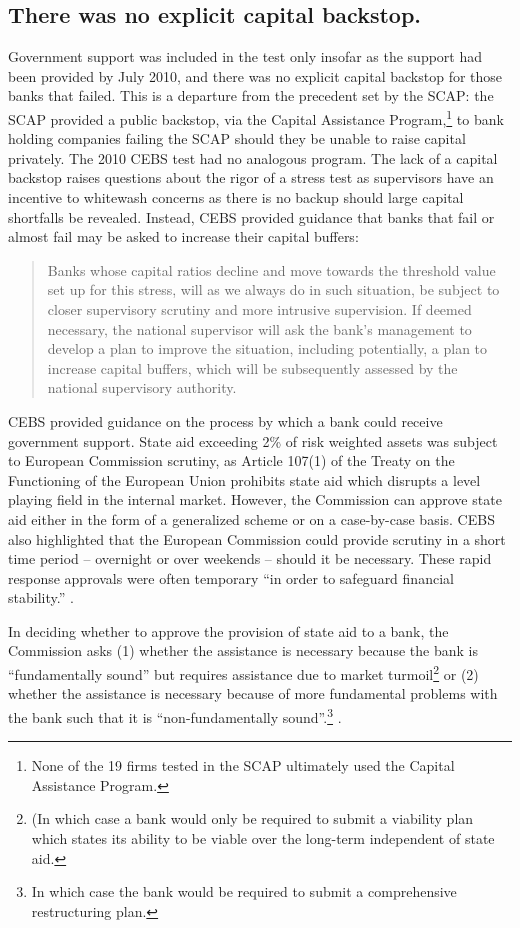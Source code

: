 \documentclass[12pt]{article}
\begin{document}
\subsection{There was no explicit capital backstop.}

Government support was included in the test only insofar as the support had been provided by July 2010, and there was no explicit capital backstop for those banks that failed. This is a departure from the precedent set by the SCAP: the SCAP provided a public backstop, via the Capital Assistance Program,\footnote{None of the 19 firms tested in the SCAP ultimately used the Capital Assistance Program.} to bank holding companies failing the SCAP should they be unable to raise capital privately. The 2010 CEBS test had no analogous program. The lack of a capital backstop raises questions about the rigor of a stress test as supervisors have an incentive to whitewash concerns as there is no backup should large capital shortfalls be revealed. Instead, CEBS provided guidance that banks that fail or almost fail may be asked to increase their capital buffers:

\begin{quote}
Banks whose capital ratios decline and move towards the threshold value set up for this stress, will as we always do in such situation, be subject to closer supervisory scrutiny and more intrusive supervision. If deemed necessary, the national supervisor will ask the bank's management to develop a plan to improve the situation, including potentially, a plan to increase capital buffers, which will be subsequently assessed by the national supervisory authority.
\end{quote}

CEBS provided guidance on the process by which a bank could receive government support. State aid exceeding 2\% of risk weighted assets was subject to European Commission scrutiny, as Article 107(1) of the Treaty on the Functioning of the European Union prohibits state aid which disrupts a level playing field in the internal market. However, the Commission can approve state aid either in the form of a generalized scheme or on a case-by-case basis. CEBS also highlighted that the European Commission could provide scrutiny in a short time period -- overnight or over weekends -- should it be necessary. These rapid response approvals were often temporary ``in order to safeguard financial stability.'' \citep{QA}.

In deciding whether to approve the provision of state aid to a bank, the Commission asks (1) whether the assistance is necessary because the bank is ``fundamentally sound'' but requires assistance due to market turmoil\footnote{(In which case a bank would only be required to submit a viability plan which states its ability to be viable over the long-term independent of state aid.} or (2) whether the assistance is necessary because of more fundamental problems with the bank such that it is ``non-fundamentally sound''.\footnote{In which case the bank would be required to submit a comprehensive restructuring plan.} \citep{QA}.
\end{document}
